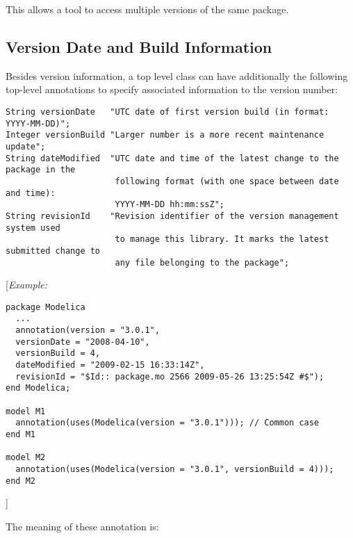 This allows a tool to access multiple versions of the same package.

\subsection{Version Date and Build Information}

Besides version information, a top level class can have additionally the
following top-level annotations to specify associated information to the
version number:

\begin{lstlisting}[language=modelica]
String versionDate   "UTC date of first version build (in format: YYYY-MM-DD)";
Integer versionBuild "Larger number is a more recent maintenance update";
String dateModified  "UTC date and time of the latest change to the package in the
                      following format (with one space between date and time):
                      YYYY-MM-DD hh:mm:ssZ";
String revisionId    "Revision identifier of the version management system used
                      to manage this library. It marks the latest submitted change to
                      any file belonging to the package";
\end{lstlisting}
{[}\emph{Example:}

\begin{lstlisting}[language=modelica]
package Modelica
  ...
  annotation(version = "3.0.1",
  versionDate = "2008-04-10",
  versionBuild = 4,
  dateModified = "2009-02-15 16:33:14Z",
  revisionId = "$Id:: package.mo 2566 2009-05-26 13:25:54Z #$");
end Modelica;

model M1
  annotation(uses(Modelica(version = "3.0.1"))); // Common case
end M1

model M2
  annotation(uses(Modelica(version = "3.0.1", versionBuild = 4)));
end M2
\end{lstlisting}
{]}

The meaning of these annotation is:


